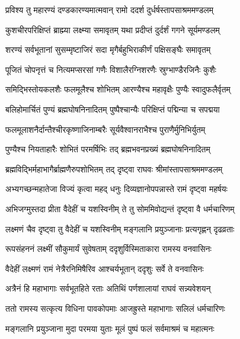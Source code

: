 
\twolineshloka
{प्रविश्य तु महारण्यं दण्डकारण्यमात्मवान्}
{रामो ददर्श दुर्धर्षस्तापसाश्रममण्डलम्} %

\twolineshloka
{कुशचीरपरिक्षिप्तं ब्राह्म्या लक्ष्म्या समावृतम्}
{यथा प्रदीप्तं दुर्दर्शं गगने सूर्यमण्डलम्} %

\twolineshloka
{शरण्यं सर्वभूतानां सुसम्मृष्टाजिरं सदा}
{मृगैर्बहुभिराकीर्णं पक्षिसङ्घैः समावृतम्} %

\twolineshloka
{पूजितं चोपनृत्तं च नित्यमप्सरसां गणैः}
{विशालैरग्निशरणैः स्रुग्भाण्डैरजिनैः कुशैः} %

\twolineshloka
{समिद्भिस्तोयकलशैः फलमूलैश्च शोभितम्}
{आरण्यैश्च महावृक्षैः पुण्यैः स्वादुफलैर्वृतम्} %

\twolineshloka
{बलिहोमार्चितं पुण्यं ब्रह्मघोषनिनादितम्}
{पुष्पैश्चान्यैः परिक्षिप्तं पद्मिन्या च सपद्मया} %

\twolineshloka
{फलमूलाशनैर्दान्तैश्चीरकृष्णाजिनाम्बरैः}
{सूर्यवैश्वानराभैश्च पुराणैर्मुनिभिर्युतम्} %

\twolineshloka
{पुण्यैश्च नियताहारैः शोभितं परमर्षिभिः}
{तद् ब्रह्मभवनप्रख्यं ब्रह्मघोषनिनादितम्} %

\twolineshloka
{ब्रह्मविद्भिर्महाभागैर्ब्राह्मणैरुपशोभितम्}
{तद् दृष्ट्वा राघवः श्रीमांस्तापसाश्रममण्डलम्} %

\twolineshloka
{अभ्यगच्छन्महातेजा विज्यं कृत्वा महद् धनुः}
{दिव्यज्ञानोपपन्नास्ते रामं दृष्ट्वा महर्षयः} %

\twolineshloka
{अभिजग्मुस्तदा प्रीता वैदेहीं च यशस्विनीम्}
{ते तु सोममिवोद्यन्तं दृष्ट्वा वै धर्मचारिणम्} %

\twolineshloka
{लक्ष्मणं चैव दृष्ट्वा तु वैदेहीं च यशस्विनीम्}
{मङ्गलानि प्रयुञ्जानाः प्रत्यगृह्णन् दृढव्रताः} %

\twolineshloka
{रूपसंहननं लक्ष्मीं सौकुमार्यं सुवेषताम्}
{ददृशुर्विस्मिताकारा रामस्य वनवासिनः} %

\twolineshloka
{वैदेहीं लक्ष्मणं रामं नेत्रैरनिमिषैरिव}
{आश्चर्यभूतान् ददृशुः सर्वे ते वनवासिनः} %

\twolineshloka
{अत्रैनं हि महाभागाः सर्वभूतहिते रताः}
{अतिथिं पर्णशालायां राघवं सन्न्यवेशयन्} %

\twolineshloka
{ततो रामस्य सत्कृत्य विधिना पावकोपमाः}
{आजह्रुस्ते महाभागाः सलिलं धर्मचारिणः} %

\twolineshloka
{मङ्गलानि प्रयुञ्जाना मुदा परमया युताः}
{मूलं पुष्पं फलं सर्वमाश्रमं च महात्मनः} %

